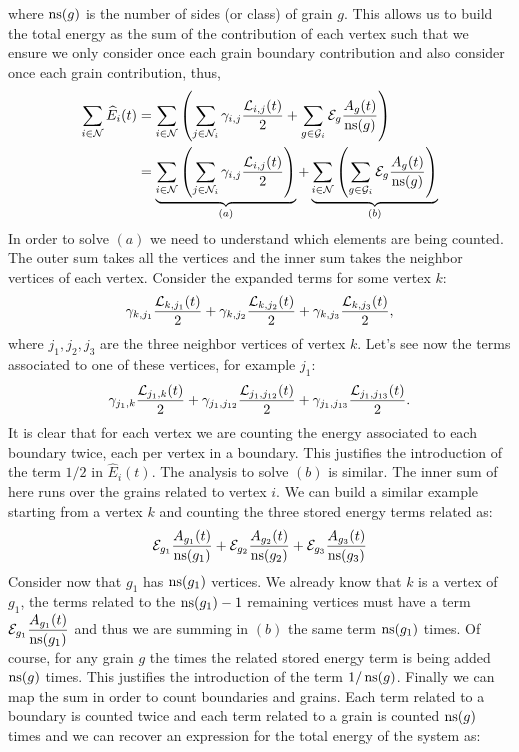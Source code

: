  where $\operatorname{ns}(g)$ is the number of sides (or class) of grain $g$. 
 This allows us to build the total energy
 as the sum of the contribution of each vertex
 such that we ensure we only consider once
 each grain boundary contribution and also consider
 once each grain contribution, thus,
\begin{align*}
     \sum_{i \in \mathcal{N}}\widehat{E}_i(t) &=
     \sum_{i \in \mathcal{N}}\left(
     \sum_{j \in \mathcal{N}_i}\gamma_{i,j}\dfrac{\mathcal{L}_{i,j}(t)}{2} + \sum_{g \in \mathcal{G}_i} \mathcal{E}_{g}\dfrac{A_{g}(t)}{\operatorname{ns}(g)}\right) \\
     &=
     \underbrace{\sum_{i \in \mathcal{N}}\left(
     \sum_{j \in \mathcal{N}_i}\gamma_{i,j}\dfrac{\mathcal{L}_{i,j}(t)}{2}\right)}_{(a)}  + 
     \underbrace{\sum_{i \in \mathcal{N}}\left(\sum_{g \in \mathcal{G}_i} \mathcal{E}_{g}\dfrac{A_{g}(t)}{\operatorname{ns}(g)}\right)}_{(b)}
 \end{align*}
In order to solve $(a)$ we need to understand which elements are being counted. The outer sum takes all the vertices and the inner sum takes the neighbor vertices of each vertex. Consider the expanded terms for some vertex $k$:
\begin{equation*} \gamma_{k,j_1} \frac{\mathcal{L}_{k,j_1}(t)}{2} + 
\gamma_{k,j_2} \frac{\mathcal{L}_{k,j_2}(t)}{2} +
\gamma_{k,j_3} \frac{\mathcal{L}_{k,j_3}(t)}{2},
\end{equation*}
where $j_1, j_2, j_3$ are the three neighbor vertices of vertex $k$. Let's see now the terms associated to one of these vertices, for example $j_1$:
\begin{equation*} \gamma_{j_1,k} \frac{\mathcal{L}_{j_1,k}(t)}{2} + 
\gamma_{j_1,j_{12}} \frac{\mathcal{L}_{j_1,j_{12}}(t)}{2} +
\gamma_{j_1,j_{13}} \frac{\mathcal{L}_{j_1,j_{13}}(t)}{2}.
\end{equation*}
It is clear that for each vertex we are counting the energy associated to each boundary twice, each per vertex in a boundary. This justifies the introduction of the term $1/2$ in $\widehat{E}_i(t)$. The analysis to solve $(b)$ is similar. The inner sum of here runs over the grains related to vertex $i$. We can build a similar example starting from a vertex $k$ and counting the three stored energy terms related as:
\begin{equation*}
    \mathcal{E}_{g_1} \frac{A_{g_1}(t)}{\operatorname{ns}(g_1)}+
    \mathcal{E}_{g_2} \frac{A_{g_2}(t)}{\operatorname{ns}(g_2)}+
    \mathcal{E}_{g_3} \frac{A_{g_3}(t)}{\operatorname{ns}(g_3)}
\end{equation*}
Consider now that $g_1$ has $\operatorname{ns}(g_1)$ vertices. We already know that $k$ is a vertex of $g_1$, the terms related to the $\operatorname{ns}(g_1) -1 $ remaining vertices must have a term $\mathcal{E}_{g_1} \dfrac{A_{g_1}(t)}{\operatorname{ns}(g_1)}$ and thus we are summing in $(b)$ the same term $\operatorname{ns}(g_1)$ times. Of course, for any grain $g$ the times the related stored energy term is being added $\operatorname{ns}(g)$ times. This justifies the introduction of the term $1/\operatorname{ns}(g)$. Finally we can map the sum in order to count boundaries and grains. Each term related to a boundary is counted twice and each term related to a grain is counted $\operatorname{ns}(g)$ times and we can recover an expression for the total energy of the system as:


